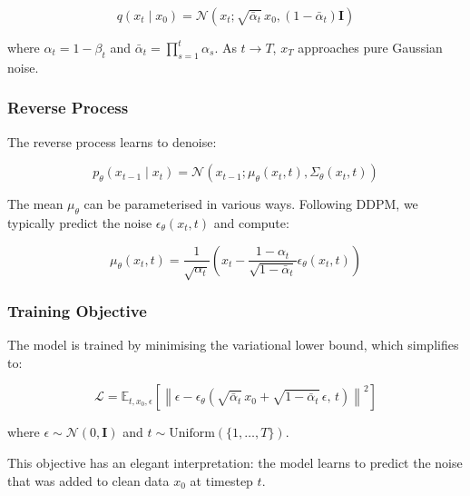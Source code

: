\begin{equation}
\label{eq:bg:forward2}
q(x_t \mid x_0) = \mathcal{N}(x_t; \sqrt{\bar{\alpha}_t}\, x_0, (1 - \bar{\alpha}_t)\mathbf{I})
\end{equation}

where $\alpha_t = 1 - \beta_t$ and $\bar{\alpha}_t = \prod_{s=1}^{t} \alpha_s$. As $t \to T$, $x_T$ approaches pure Gaussian noise.

\subsubsection{Reverse Process}
\label{sec:bg:diffusion:reverse}

The reverse process learns to denoise:

\begin{equation}
\label{eq:bg:reverse1}
p_\theta(x_{t-1} \mid x_t) = \mathcal{N}(x_{t-1}; \mu_\theta(x_t, t), \Sigma_\theta(x_t, t))
\end{equation}

The mean $\mu_\theta$ can be parameterised in various ways. Following DDPM, we typically predict the noise $\epsilon_\theta(x_t, t)$ and compute:

\begin{equation}
\label{eq:bg:reverse2}
\mu_\theta(x_t, t) = \frac{1}{\sqrt{\alpha_t}} \left( x_t - \frac{1 - \alpha_t}{\sqrt{1 - \bar{\alpha}_t}} \epsilon_\theta(x_t, t) \right)
\end{equation}

\subsubsection{Training Objective}
\label{sec:bg:diffusion:training}

The model is trained by minimising the variational lower bound, which simplifies to:

\begin{equation}
\label{eq:bg:training}
\mathcal{L} = \mathbb{E}_{t, x_0, \epsilon} \left[ \left\| \epsilon - \epsilon_\theta\!\left( \sqrt{\bar{\alpha}_t}\, x_0 + \sqrt{1 - \bar{\alpha}_t}\, \epsilon, \, t \right) \right\|^2 \right]
\end{equation}

where $\epsilon \sim \mathcal{N}(0, \mathbf{I})$ and $t \sim \text{Uniform}(\{1, \ldots, T\})$.

This objective has an elegant interpretation: the model learns to predict the noise that was added to clean data $x_0$ at timestep $t$.


